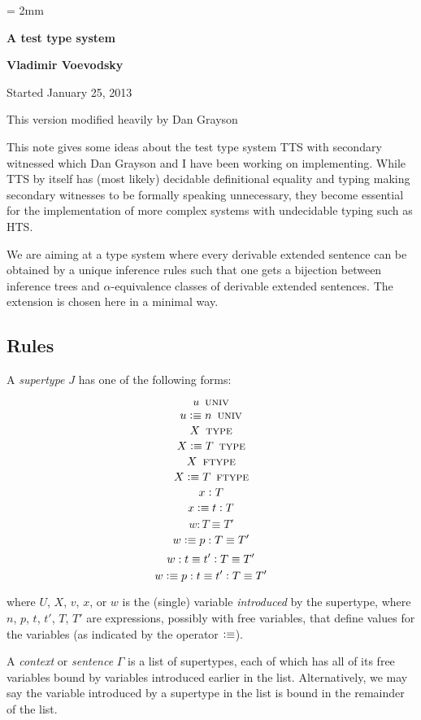 \documentclass[11pt]{article}
\newcommand{\eqd}{\equiv}
\newcommand{\ccolon}{\vcentcolon}
\newcommand{\UNIV}{\mathop{\text{ \sc univ}}}
\newcommand{\TYPE}{\mathop{\text{ \sc type}}}
\newcommand{\FTYPE}{\mathop{\text{ \sc ftype}}}
\newcommand{\defn}{\vcentcolon\equiv}
\begin{document}
\parskip = 2mm
\begin{center}
{\bf\Large A test type system}

{\bf Vladimir Voevodsky}

{Started January 25, 2013}  

{This version modified heavily by Dan Grayson}  
\end{center}

\tableofcontents

This note gives some ideas about the test type system TTS with secondary
witnessed which Dan Grayson and I have been working on implementing. While TTS
by itself has (most likely) decidable definitional equality and typing making
secondary witnesses to be formally speaking unnecessary, they become essential
for the implementation of more complex systems with undecidable typing such as
HTS.

We are aiming at a type system where every derivable extended sentence can be
obtained by a unique inference rules such that one gets a bijection between
inference trees and $\alpha$-equivalence classes of derivable extended
sentences.  The extension is chosen here in a minimal way.

\subsection{Rules}

A {\em supertype} $J$ has one of the following forms:

$$ u \UNIV $$
$$ u \defn n \UNIV $$
$$ X \TYPE $$
$$ X \defn T \TYPE $$
$$ X \FTYPE $$
$$ X \defn T \FTYPE $$
$$ x \ccolon T $$
$$ x \defn t \ccolon T $$
$$ w : T \eqd T' $$
$$ w \defn p : T \eqd T' $$
$$ w : t \eqd t' \ccolon T \eqd T' $$
$$ w \defn p : t \eqd t' \ccolon T \eqd T' $$

where $U$, $X$, $v$, $x$, or $w$ is the (single) variable {\em introduced} by
the supertype, where $n$, $p$, $t$, $t'$, $T$, $T'$ are expressions, possibly
with free variables, that define values for the variables (as indicated by the
operator $\defn$).

A {\em context} or {\em sentence} $\Gamma$ is a list of supertypes, each of
which has all of its free variables bound by variables introduced earlier in
the list.  Alternatively, we may say the variable introduced by a supertype in
the list is bound in the remainder of the list.
\end{document}
